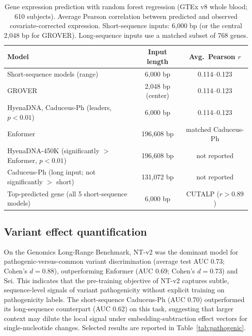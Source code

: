 \documentclass[11pt,a4paper]{article}
\begin{document}
\begin{table}[t]
\centering
\caption{Gene expression prediction with random forest regression (GTEx v8 whole blood; 610 subjects). Average Pearson correlation between predicted and observed covariate-corrected expression. Short-sequence inputs: 6{,}000 bp (or the central 2{,}048 bp for GROVER). Long-sequence inputs use a matched subset of 768 genes.}
\label{tab:expr}
\begin{tabular}{lcc}
\toprule
Model & Input length & Avg.\ Pearson $r$ \\
\midrule
Short-sequence models (range)                 & 6{,}000 bp  & 0.114--0.123 \\
GROVER                                         & 2{,}048 bp (center) & 0.114--0.123 \\
HyenaDNA, Caduceus-Ph (leaders, $p<0.01$)      & 6{,}000 bp  & 0.114--0.123 \\
\midrule
Enformer                                       & 196{,}608 bp & matched Caduceus-Ph \\
HyenaDNA-450K (significantly $>$ Enformer, $p<0.01$) & 196{,}608 bp & not reported \\
Caduceus-Ph (long input; not significantly $>$ short) & 131{,}072 bp & not reported \\
\midrule
Top-predicted gene (all 5 short-sequence models) & 6{,}000 bp & CUTALP ($r>0.89$) \\
\bottomrule
\end{tabular}
\end{table}

\subsection{Variant effect quantification}
On the Genomics Long-Range Benchmark, NT-v2 was the dominant model for pathogenic-versus-common variant discrimination (average test AUC 0.73; Cohen's $d=0.88$), outperforming Enformer (AUC 0.69; Cohen's $d=0.73$) and Sei. This indicates that the pre-training objective of NT-v2 captures subtle, sequence-level signals of variant pathogenicity without explicit training on pathogenicity labels. The short-sequence Caduceus-Ph (AUC 0.70) outperformed its long-sequence counterpart (AUC 0.62) on this task, suggesting that larger context may dilute the local signal under embedding-subtraction effect vectors for single-nucleotide changes. Selected results are reported in Table~\ref{tab:pathogenic}.
\end{document}
